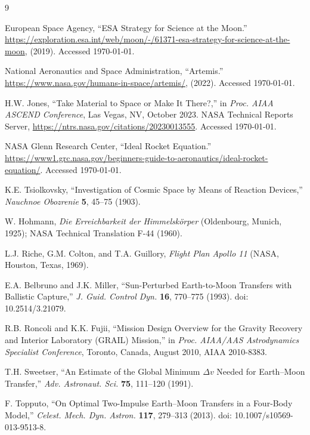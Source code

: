 \documentclass[10pt,twocolumn]{revtex4-2}    %
\begin{document}
\begin{thebibliography}{9}

European Space Agency, ``ESA Strategy for Science at the Moon.'' \url{https://exploration.esa.int/web/moon/-/61371-esa-strategy-for-science-at-the-moon}, (2019). Accessed \today.

National Aeronautics and Space Administration,
``Artemis.''
\url{https://www.nasa.gov/humans-in-space/artemis/}, (2022).
Accessed \today.

H.W. Jones, ``Take Material to Space or Make It There?,''
in \textit{Proc. AIAA ASCEND Conference}, Las Vegas, NV, October 2023.
NASA Technical Reports Server, \url{https://ntrs.nasa.gov/citations/20230013555}.
Accessed \today.

NASA Glenn Research Center, ``Ideal Rocket Equation.''
\url{https://www1.grc.nasa.gov/beginners-guide-to-aeronautics/ideal-rocket-equation/}.
Accessed \today.

K.E. Tsiolkovsky, ``Investigation of Cosmic Space by Means of Reaction Devices,''
\textit{Nauchnoe Obozrenie} \textbf{5}, 45--75 (1903).

W. Hohmann, \textit{Die Erreichbarkeit der Himmelsk\"{o}rper}
(Oldenbourg, Munich, 1925);
NASA Technical Translation F-44 (1960).

L.J. Riche, G.M. Colton, and T.A. Guillory,
\textit{Flight Plan Apollo 11}
(NASA, Houston, Texas, 1969).

E.A. Belbruno and J.K. Miller,
``Sun-Perturbed Earth-to-Moon Transfers with Ballistic Capture,''
\textit{J. Guid. Control Dyn.} \textbf{16}, 770--775 (1993).
doi: 10.2514/3.21079.

R.B. Roncoli and K.K. Fujii, ``Mission Design Overview for the Gravity Recovery
and Interior Laboratory ({GRAIL}) Mission,''
in \textit{Proc. AIAA/AAS Astrodynamics Specialist Conference},
Toronto, Canada, August 2010, AIAA 2010-8383.

T.H. Sweetser,
``An Estimate of the Global Minimum $\Delta v$ Needed for Earth--Moon Transfer,''
\textit{Adv. Astronaut. Sci.} \textbf{75}, 111--120 (1991).

F. Topputo, ``On Optimal Two-Impulse Earth--Moon Transfers in a Four-Body Model,''
\textit{Celest. Mech. Dyn. Astron.} \textbf{117}, 279--313 (2013).
doi: 10.1007/s10569-013-9513-8.


\end{thebibliography}
\end{document}
